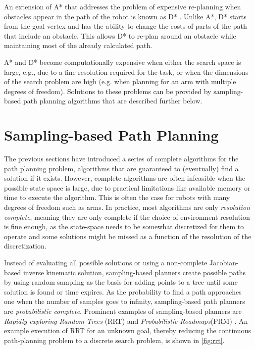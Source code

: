 An extension of A* that addresses the problem of expensive re-planning when obstacles appear in the path of the robot is known as D* \cite{stentz1994optimal}. Unlike A*, D* starts from the goal vertex and has the ability to change the costs of parts of the path that include an obstacle. This allows D* to re-plan around an obstacle while maintaining most of the already calculated path.

A* and D* become computationally expensive when either the search space is large, e.g., due to a fine resolution required for the task, or when the dimensions of the search problem are high (e.g. when planning for an arm with multiple degrees of freedom). Solutions to these problems can be provided by sampling-based path planning algorithms that are described further below.


\section{Sampling-based Path Planning}

The previous sections have introduced a series of complete algorithms for the path planning problem, algorithms that are guaranteed to (eventually) find a solution if it exists. However, complete algorithms are often infeasible when the possible state space is large, due to practical limitations like available memory or time to execute the algorithm. This is often the case for robots with many degrees of freedom such as arms. In practice, most algorithms are only \textsl{resolution complete}, meaning they are only complete if the choice of environment resolution is fine enough, as the state-space needs to be somewhat discretized for them to operate and some solutions might be missed as a function of the resolution of the discretization.

Instead of evaluating all possible solutions or using a non-complete Jacobian-based inverse kinematic solution, sampling-based planners create possible paths by using random sampling as the basis for adding points to a tree until some solution is found or time expires. As the probability to find a path approaches one when the number of samples goes to infinity, sampling-based path planners are \textsl{probabilistic complete}. Prominent examples of sampling-based planners are \textsl{Rapidly-exploring Random Trees} (RRT)\cite{lavalle1998rapidly} and \textsl{Probabilistic Roadmaps}(PRM) \cite{kavraki1996probabilistic}. An example execution of RRT for an unknown goal, thereby reducing the continuous path-planning problem to a discrete search problem, is shown in \cref{fig:rrt}.

